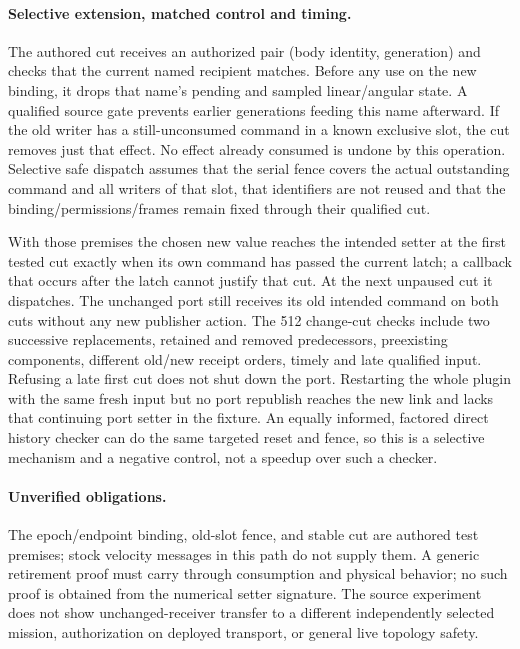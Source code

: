 \documentclass{article}
\begin{document}
\paragraph{Selective extension, matched control and timing.}
The authored cut receives an authorized pair (body identity, generation)
and checks that the current named recipient matches. Before any use on the
new binding, it drops that name's pending and sampled linear/angular
state. A qualified source gate prevents earlier generations feeding this
name afterward. If the old writer has a still-unconsumed command in a
known exclusive slot, the cut removes just that effect. No effect already
consumed is undone by this operation. Selective safe dispatch assumes
that the serial fence covers the actual outstanding command and all
writers of that slot, that identifiers are not reused and that the
binding/permissions/frames remain fixed through their qualified cut.

With those premises the chosen new value reaches the intended setter at
the first tested cut exactly when its own command has passed the current
latch; a callback that occurs after the latch cannot justify that cut.
At the next unpaused cut it dispatches. The unchanged port still receives
its old intended command on both cuts without any new publisher action.
The 512 change-cut checks include two successive replacements, retained
and removed predecessors, preexisting components, different old/new
receipt orders, timely and late qualified input. Refusing a late first
cut does not shut down the port. Restarting the whole plugin with the
same fresh input but no port republish reaches the new link and lacks
that continuing port setter in the fixture. An equally informed,
factored direct history checker can do the same targeted reset and
fence, so this is a selective mechanism and a negative control, not a
speedup over such a checker.

\paragraph{Unverified obligations.}
The epoch/endpoint binding, old-slot fence, and stable cut are authored
test premises; stock velocity messages in this path do not supply
them. A generic retirement proof must carry through consumption and
physical behavior; no such proof is obtained from the numerical setter
signature. The source experiment does not show unchanged-receiver
transfer to a different independently selected mission, authorization on
deployed transport, or general live topology safety.
\end{document}
